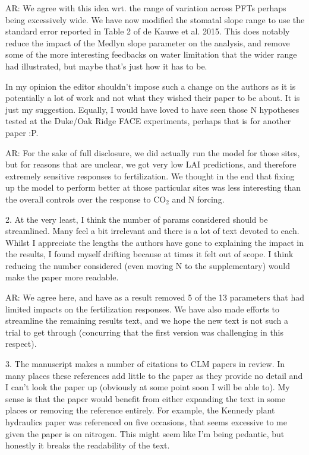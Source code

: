 \documentclass{article}
\begin{document}
\textsf{AR: We agree with this idea wrt. the range of variation across PFTs perhaps being excessively wide. We have now modified the stomatal slope range to use the standard error reported in Table 2 of de Kauwe et al. 2015. This does notably reduce the impact of the Medlyn slope parameter on the analysis, and remove some of the more interesting feedbacks on water limitation that the wider range had illustrated, but maybe that's just how it has to be.}

In my opinion the editor shouldn't impose such a change on the authors as it is potentially a lot of work and not what they wished their paper to be about. It is just my suggestion. Equally, I would have loved to have seen those N hypotheses tested at the Duke/Oak Ridge FACE experiments, perhaps that is for another paper :P.

\textsf{AR: For the sake of full disclosure, we did actually run the model for those sites, but for reasons that are unclear, we got very low LAI predictions, and therefore extremely sensitive responses to fertilization. We thought in the end that fixing up the model to perform better at those particular sites was less interesting than the overall controls over the response to CO$_{2}$ and N forcing.}

2. At the very least, I think the number of params considered should be streamlined. Many feel a bit irrelevant and there is a lot of text devoted to each. Whilst I appreciate the lengths the authors have gone to explaining the impact in the results, I found myself drifting because at times it felt out of scope. I think reducing the number considered (even moving N to the supplementary) would make the paper more readable. 

\textsf{AR: We agree here, and have as a result removed 5 of the 13 parameters that had limited impacts on the fertilization responses. We have also made efforts to streamline the remaining results text, and we hope the new text is not such a trial to get through (concurring that the first version was challenging in this respect). }

3. The manuscript makes a number of citations to CLM papers in review. In many places these references add little to the paper as they provide no detail and I can't look the paper up (obviously at some point soon I will be able to). My sense is that the paper would benefit from either expanding the text in some places or removing the reference entirely. For example, the Kennedy plant hydraulics paper was referenced on five occasions, that seems excessive to me given the paper is on nitrogen. This might seem like I'm being pedantic, but honestly it breaks the readability of the text. 
\end{document}
